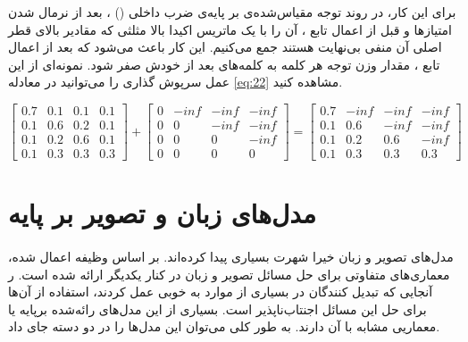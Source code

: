 {    برای این کار، در روند توجه مقیاس‌شده‌ی بر پایه‌ی ضرب داخلی 
    ()
    ، بعد از نرمال شدن امتیازها و قبل از اعمال تابع 
    ، آن‌ را با یک ماتریس اکیدا
    بالا مثلثی که مقادیر بالای قطر اصلی آن منفی بی‌نهایت هستند جمع می‌کنیم.
    این کار باعث می‌شود که بعد از اعمال تابع 
    ، مقدار وزن توجه هر کلمه به کلمه‌های بعد از خودش صفر شود. نمونه‌ای 
    از این عمل سرپوش گذاری را می‌توانید در معادله
    \ref{eq:22}
    مشاهده کنید. 

    \begin{center}
        \begin{equation} \label{eq:22}
           \begin{bmatrix}
                0.7 & 0.1 & 0.1 & 0.1 \\
                0.1 & 0.6 & 0.2 & 0.1 \\
                0.1 & 0.2 & 0.6 & 0.1 \\
                0.1 & 0.3 & 0.3 & 0.3
           \end{bmatrix}
            +
            \begin{bmatrix}
                0 & -inf & -inf & -inf \\
                0 & 0 &  -inf & -inf \\
                0 & 0 &  0 &   -inf\\
                0 & 0 &  0 & 0
           \end{bmatrix} 
           =
           \begin{bmatrix}
            0.7 & -inf & -inf & -inf \\
            0.1 & 0.6 &  -inf & -inf \\
            0.1 & 0.2 &  0.6 &   -inf\\
            0.1 & 0.3 &  0.3 & 0.3
       \end{bmatrix} 
        \end{equation}
    \end{center}
}
\section{
    مدل‌های زبان و تصویر بر پایه 
}
\label{sec:bertlike_arcs}
\paragraph{}
{
    مدل‌‌های تصویر و زبان خیرا شهرت بسیاری پیدا کرده‌اند. بر اساس وظیفه اعمال شده، 
    معماری‌های متفاوتی برای حل مسائل تصویر و زبان در کنار یکدیگر ارائه شده است.
    ر آنجایی که تبدیل کنندگان در بسیاری از موارد به خوبی عمل کردند، استفاده
    از آن‌ها برای حل این مسائل اجنتاب‌ناپذیر است. بسیاری از این مدل‌های رائه‌شده
    برپایه 
    یا معماریی مشابه با آن دارند. به طور کلی می‌توان این مدل‌ها را در دو دسته جای داد.
}
